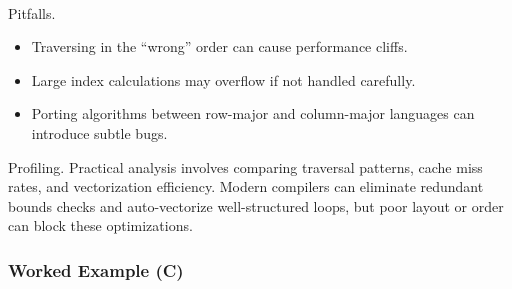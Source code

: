 \documentclass[
  letterpaper,
  DIV=11,
  numbers=noendperiod]{scrreprt}
\makeatletter
\let\oldparagraph\paragraph
\renewcommand{\paragraph}{
    \@ifstar
      \xxxParagraphStar
      \xxxParagraphNoStar
  }
\newcommand{\xxxParagraphStar}[1]{\oldparagraph*{#1}\mbox{}}
\newcommand{\xxxParagraphNoStar}[1]{\oldparagraph{#1}\mbox{}}
\providecommand{\tightlist}{%
  \setlength{\itemsep}{0pt}\setlength{\parskip}{0pt}}
\makeatother
\begin{document}
\paragraph{Pitfalls.}\label{pitfalls.-3}

\begin{itemize}
\tightlist
\item
  Traversing in the ``wrong'' order can cause performance cliffs.
\item
  Large index calculations may overflow if not handled carefully.
\item
  Porting algorithms between row-major and column-major languages can
  introduce subtle bugs.
\end{itemize}

Profiling. Practical analysis involves comparing traversal patterns,
cache miss rates, and vectorization efficiency. Modern compilers can
eliminate redundant bounds checks and auto-vectorize well-structured
loops, but poor layout or order can block these optimizations.

\subsubsection{Worked Example (C)}\label{worked-example-c-1}
\end{document}
